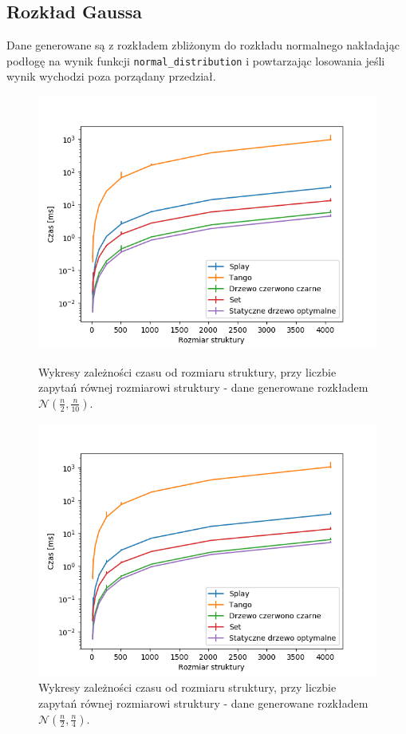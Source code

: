 \documentclass[declaration,shortabstract]{iithesis}
\theoremstyle{thm}
\theoremstyle{remark}
\theoremstyle{plain}
\theoremstyle{plain}
\theoremstyle{plain}
\begin{document}
\subsection{Rozkład Gaussa}
Dane generowane są z rozkładem zbliżonym do rozkładu normalnego nakładając podłogę na wynik funkcji \texttt{normal\_distribution} i powtarzając losowania jeśli wynik wychodzi poza porządany przedział.
\begin{figure}[ht]
\begin{minipage}[b]{.45\textwidth}
\centering
\includegraphics[width=1\textwidth]{wykresy/gaus01_main.png}
\caption{Wykresy zależności czasu od rozmiaru struktury, przy liczbie zapytań równej rozmiarowi struktury - dane generowane rozkładem \(\mathcal{N}(\frac{n}{2}, \frac{n}{10})\). }
\end{minipage}
\hfill
\begin{minipage}[b]{.45\textwidth}
\centering
\includegraphics[width=1\textwidth]{wykresy/gaus025_main.png}
\caption{Wykresy zależności czasu od rozmiaru struktury, przy liczbie zapytań równej rozmiarowi struktury - dane generowane rozkładem \(\mathcal{N}(\frac{n}{2}, \frac{n}{4})\).}
\end{minipage}
\end{figure}\\
\end{document}
